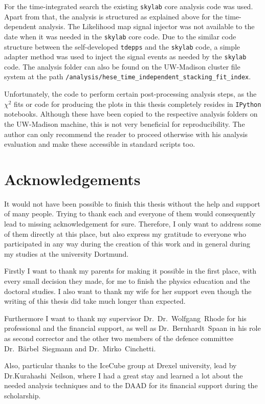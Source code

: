 For the time-integrated search the existing \lstinline!skylab! core analysis code was used.
Apart from that, the analysis is structured as explained above for the time-dependent analysis.
The Likelihood map signal injector was not available to the date when it was needed in the \lstinline!skylab! core code.
Due to the similar code structure between the self-developed \lstinline!tdepps! and the \lstinline!skylab! code, a simple adapter method was used to inject the signal events as needed by the \lstinline!skylab! code.
The analysis folder can also be found on the UW-Madison cluster file system at the path \lstinline!/analysis/hese_time_independent_stacking_fit_index!.

Unfortunately, the code to perform certain post-processing analysis steps, as the $\chi^2$ fits or code for producing the plots in this thesis completely resides in \lstinline!IPython! notebooks.
Although these have been copied to the respective analysis folders on the UW-Madison machine, this is not very beneficial for reproducibility.
The author can only recommend the reader to proceed otherwise with his analysis evaluation and make these accessible in standard scripts too.

\newpage
\section{Acknowledgements}
It would not have been possible to finish this thesis without the help and support of many people.
Trying to thank each and everyone of them would consequently lead to missing acknowledgement for sure.
Therefore, I only want to address some of them directly at this place, but also express my gratitude to everyone who participated in any way during the creation of this work and in general during my studies at the university Dortmund.

Firstly I want to thank my parents for making it possible in the first place, with every small decision they made, for me to finish the physics education and the doctoral studies.
I also want to thank my wife for her support even though the writing of this thesis did take much longer than expected.

Furthermore I want to thank my supervisor Dr.~Dr.~Wolfgang~Rhode for his professional and the financial support, as well as Dr.~Bernhardt~Spaan in his role as second corrector and the other two members of the defence committee Dr.~Bärbel~Siegmann and Dr.~Mirko~Cinchetti.

Also, particular thanks to the IceCube group at Drexel university, lead by Dr.Kurahashi~Neilson, where I had a great stay and learned a lot about the needed analysis techniques and to the DAAD for its financial support during the scholarship.

